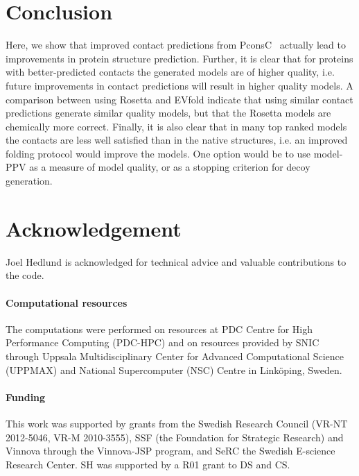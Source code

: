 \documentclass{bioinfo}
\begin{document}
\section{Conclusion}

Here, we show that improved contact predictions from
PconsC~\cite{skwark_PconsC:_2013} actually lead to improvements in
protein structure prediction. Further, it is clear that for proteins
with better-predicted contacts the generated models are of higher
quality, i.e. future improvements in contact predictions will result
in higher quality models. A comparison between using Rosetta and
EVfold indicate that using similar contact predictions generate
similar quality models, but that the Rosetta models are chemically
more correct. Finally, it is also clear that in many top ranked models
the contacts are less well satisfied than in the native structures,
i.e. an improved folding protocol would improve the models. One
option would be to use model-PPV as a measure of model quality, or as
a stopping criterion for decoy generation.



\section*{Acknowledgement}
Joel Hedlund is acknowledged for technical advice and valuable contributions to the code. 

\paragraph{Computational resources\textcolon}
The computations were performed on resources  at PDC Centre for High Performance Computing (PDC-HPC) and on resources provided by SNIC through Uppsala Multidisciplinary Center for Advanced Computational Science (UPPMAX) and National Supercomputer (NSC) Centre in Linköping, Sweden. 

\paragraph{Funding\textcolon}
This work was supported by grants from the Swedish
Research Council (VR-NT 2012-5046, VR-M 2010-3555), SSF (the Foundation for
Strategic Research) and Vinnova through the Vinnova-JSP program, and SeRC the
Swedish E-science Research Center. SH was supported by a R01 grant to
DS and CS.


%
%
%
%
%
%
%

\end{document}
